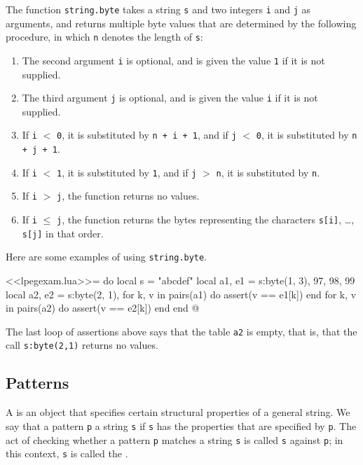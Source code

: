 \documentclass{article}
\begin{document}
The function \texttt{string.byte} takes a string \texttt{s} and two
integers \verb|i| and \verb|j| as arguments, and returns multiple byte
values that are determined by the following procedure, in which
\verb|n| denotes the length of \verb|s|:
\begin{enumerate}
\item The second argument \verb|i| is optional, and is given the value
  \verb|1| if it is not supplied.
\item The third argument \verb|j| is optional, and is given the value
  \verb|i| if it is not supplied.
\item If \verb|i| \(<\) \verb|0|, it is substituted by
  \verb|n + i + 1|, and if \verb|j| \(<\) \verb|0|, it is substituted
  by \verb|n + j + 1|.
\item If \verb|i| \(<\) \verb|1|, it is substituted by \verb|1|, and
  if \verb|j| \(>\) \verb|n|, it is substituted by \verb|n|.
\item If \verb|i| \(>\) \verb|j|, the function returns no values.
\item If \verb|i| \(\leq\) \verb|j|, the function returns the bytes
  representing the characters \verb|s[i]|, \dots, \verb|s[j]| in that
  order.
\end{enumerate}

Here are some examples of using \verb|string.byte|.
\begin{codechunk}
<<lpegexam.lua>>=
do
  local s = "abcdef"
  local a1, e1 = {s:byte(1, 3)}, {97, 98, 99}
  local a2, e2 = {s:byte(2, 1)}, {}
  for k, v in pairs(a1) do
    assert(v == e1[k])
  end
  for k, v in pairs(a2) do
    assert(v == e2[k])
  end
end
@
\end{codechunk}
The last loop of assertions above says that the table \verb|a2| is
empty, that is, that the call \verb|s:byte(2,1)| returns no values.

\subsection{Patterns}
\label{sec:6sb55afv}

A  is an object that specifies certain structural
properties of a general string.  We say that a pattern \verb|p|
 a string \verb|s| if \verb|s| has the properties
that are specified by \verb|p|.  The act of checking whether a pattern
\verb|p| matches a string \verb|s| is called 
\verb|s| against \verb|p|; in this context, \verb|s| is called the
.
\end{document}
